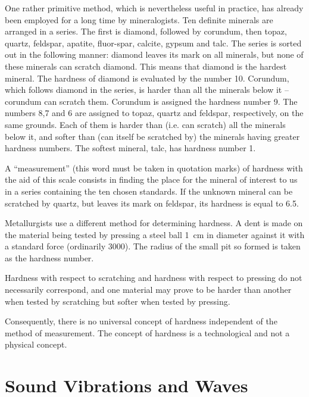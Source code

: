 One rather primitive method, which is nevertheless use­ful in practice, has already been employed for a long time by mineralogists. Ten definite minerals are arranged in a series. The first is diamond, followed by corundum, then topaz, quartz, feldspar, apatite, fluor-spar, calcite, gyp­sum and talc. The series is sorted out in the following manner: diamond leaves its mark on all minerals, but none of these minerals can scratch diamond. This means that diamond is the hardest mineral. The hardness of diamond is evaluated by the number 10. Corundum, which follows diamond in the series, is harder than all the min­erals below it -- corundum can scratch them. Corundum is assigned the hardness number 9. The numbers 8,7 and 6 are assigned to topaz, quartz and feldspar, respectively, on the same grounds. Each of them is harder than (i.e. can scratch) all the minerals below it, and softer than (can itself be scratched by) the minerals having greater hardness numbers. The softest mineral, talc, has hardness number 1.

A ``measurement'' (this word must be taken in quotation marks) of hardness with the aid of this scale consists in finding the place for the mineral of interest to us in a series containing the ten chosen standards. If the unknown mineral can be scratched by quartz, but leaves its mark on feldspar, its hardness is equal to 6.5.

Metallurgists use a different method for determining hardness. A dent is made on the material being tested by pressing a steel ball \SI{1}{\centi\meter} in diameter against it with a standard force (ordinarily \SI{3000}{\kgf}). The radius of the small pit so formed is taken as the hardness number.

Hardness with respect to scratching and hardness with respect to pressing do not necessarily correspond, and one material may prove to be harder than another when tested by scratching but softer when tested by pressing.

Consequently, there is no universal concept of hardness independent of the method of measurement. The concept of hardness is a technological and not a physical con­cept.

\section{Sound Vibrations and Waves}

